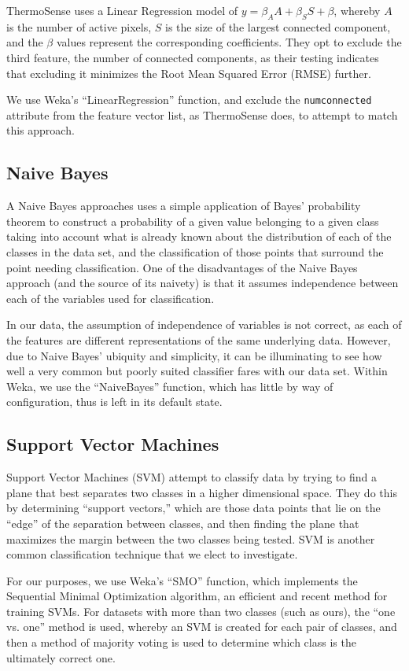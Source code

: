 \documentclass[../thesis/thesis.tex]{subfiles}
\begin{document}
ThermoSense uses a Linear Regression model of $y = \beta_A A + \beta_S S + \beta $, whereby $A$ is the number of active pixels, $S$ is the size of the largest connected component, and the $\beta$ values represent the corresponding coefficients. They opt to exclude the third feature, the number of connected components, as their testing indicates that excluding it minimizes the Root Mean Squared Error (RMSE) further. 

We use Weka's ``LinearRegression'' function, and exclude the \texttt{numconnected} attribute from the feature vector list, as ThermoSense does, to attempt to match this approach.

\subsection{Naive Bayes}
A Naive Bayes approaches uses a simple application of Bayes' probability theorem to construct a probability of a given value belonging to a given class taking into account what is already known about the distribution of each of the classes in the data set, and the classification of those points that surround the point needing classification. One of the disadvantages of the Naive Bayes approach (and the source of its naivety) is that it assumes independence between each of the variables used for classification.

In our data, the assumption of independence of variables is not correct, as each of the features are different representations of the same underlying data. However, due to Naive Bayes' ubiquity and simplicity, it can be illuminating to see how well a very common but poorly suited classifier fares with our data set. Within Weka, we use the ``NaiveBayes'' function, which has little by way of configuration, thus is left in its default state.

\subsection{Support Vector Machines}
Support Vector Machines (SVM) attempt to classify data by trying to find a plane that best separates two classes in a higher dimensional space. They do this by determining ``support vectors,'' which are those data points that lie on the ``edge'' of the separation between classes, and then finding the plane that maximizes the margin between the two classes being tested. SVM is another common classification technique that we elect to investigate.

For our purposes, we use Weka's ``SMO'' function, which implements the Sequential Minimal Optimization algorithm, an efficient and recent method for training SVMs. For datasets with more than two classes (such as ours), the ``one vs. one'' method is used, whereby an SVM is created for each pair of classes, and then a method of majority voting is used to determine which class is the ultimately correct one. %
\end{document}
